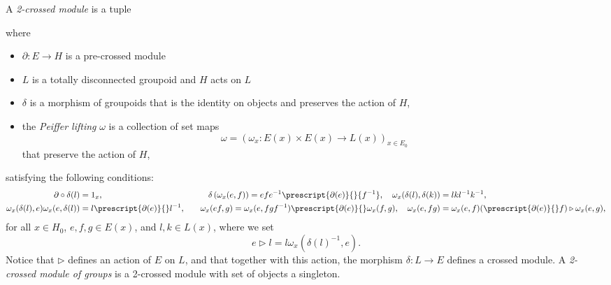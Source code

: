 \documentclass[a4paper, oneside]{amsart}
\numberwithin{equation}{subsection}
\theoremstyle{referencedlemma}
\theoremstyle{plain} %
\theoremstyle{remark}
\begin{document}
A \emph{2-crossed module} is a tuplewhere 
\begin{itemize}
\item $\partial \colon E \to H$ is a pre-crossed module
\item $L$ is a totally disconnected groupoid and $H$ acts on $L$
\item $\delta$ is a morphism of groupoids that is the identity on objects and preserves the action of $H$, 
\item the \emph{Peiffer lifting} $\omega$ is a collection of set maps
$$
\omega = (\omega_x \colon E(x)\times E(x) \to L(x))_{x\in E_0}
$$
that preserve the action of $H$,
\end{itemize}
satisfying the following conditions:
\begin{align*}
\partial \circ \delta(l) &= 1_x, \quad &\delta \left(\omega_x(e,f)\right) = efe^{-1}\prescript{\partial (e)}{}{f^{-1}}, \quad \omega_x(\delta (l), \delta (k)) &= lkl^{-1}k^{-1},\\
\omega_x(\delta (l), e)\omega_x(e, \delta (l)) &= l\prescript{\partial (e)}{}l^{-1}, \quad &\omega_x(ef,g) = \omega_x(e,fgf^{-1})\prescript{\partial (e)}{}\omega_x(f,g),\quad \omega_x(e,fg) &= \omega_x(e,f) (\prescript{\partial (e)}{}f)\triangleright \omega_x(e,g),
\end{align*}
for all $x\in H_0$, $e, f, g\in E(x)$, and $l,k\in L(x)$, where we set 
\begin{equation*}
e \triangleright l = l\omega_x(\delta(l)^{-1}, e).
\end{equation*}
Notice that $\triangleright$ defines an action of ${E}$ on ${L}$, and that together with this action, the morphism $\delta \colon {L}\to {E}$ defines a crossed module. A \emph{2-crossed module of groups} is a 2-crossed module with set of objects a singleton.
\end{document}
